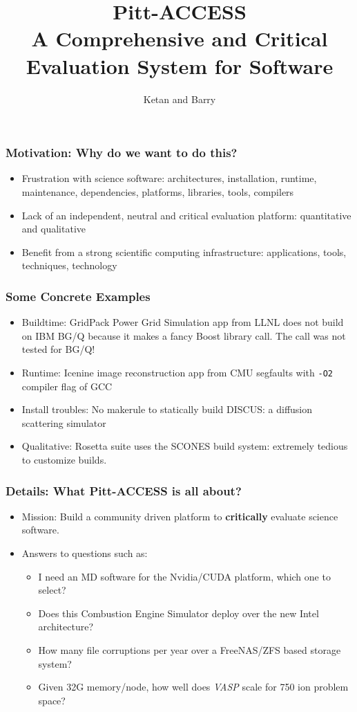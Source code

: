 \documentclass[hyperref={pdfpagelabels=false},12pt]{beamer}
\title[Pitt Access]{{\large Pitt-ACCESS\\ A Comprehensive and Critical Evaluation System for Software}}
\author[Pitt-Access]{{Ketan and Barry}}
\date{}
\begin{document}
\begin{frame}[plain]
\titlepage
\end{frame}

\begin{frame}
\frametitle{Motivation: Why do we want to do this?}
\begin{itemize}
\itemsep1em
\item 
Frustration with science software: architectures, installation, runtime, maintenance, dependencies, platforms, libraries, tools, compilers
\item 
Lack of an independent, neutral and critical evaluation platform: quantitative and qualitative
\item 
Benefit from a strong scientific computing infrastructure: applications, tools, techniques, technology
\end{itemize}
\end{frame}

\begin{frame}
\frametitle{Some Concrete Examples}
\begin{itemize}
\itemsep1em
\item Buildtime: GridPack Power Grid Simulation app from LLNL does not build on IBM BG/Q because it makes a fancy Boost library call. The call was not tested for BG/Q!
\item Runtime: Icenine image reconstruction app from CMU segfaults with \texttt{-O2} compiler flag of GCC
\item Install troubles: No makerule to statically build DISCUS: a diffusion scattering simulator
\item Qualitative: Rosetta suite uses the SCONES build system: extremely tedious to customize builds.
\end{itemize}
\end{frame}

\begin{frame}
\frametitle{Details: What Pitt-ACCESS is all about?}
\begin{itemize}
\itemsep1em
\item 
Mission: Build a community driven platform to \textbf{critically} evaluate science software.
\item 
Answers to questions such as:
\begin{itemize}
\item 
I need an MD software for the Nvidia/CUDA platform, which one to select?
\item 
Does this Combustion Engine Simulator deploy over the new Intel architecture?
\item
How many file corruptions per year over a FreeNAS/ZFS based storage system?
\item 
Given 32G memory/node, how well does \textit{VASP} scale for 750 ion problem space?
\end{itemize}
\end{itemize}

\end{frame}
\end{document}
